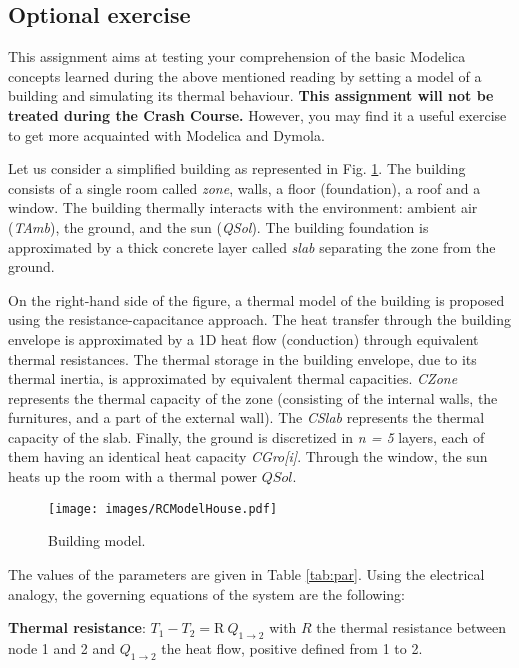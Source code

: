 \documentclass[10pt,a4paper]{article}
\begin{document}
\vspace{15 mm}

\subsection*{Optional exercise}
This assignment aims at testing your comprehension of the basic Modelica concepts learned during the above mentioned reading by setting a model of a building and simulating its thermal behaviour. \textbf{This assignment will not be treated during the Crash Course.} However, you may find it a useful exercise to get more acquainted with Modelica and Dymola.

Let us consider a simplified building as represented in Fig. \ref{fig:bui}. The building consists of a single room called \textit{zone}, walls, a floor (foundation), a roof and a window. The building thermally interacts with the environment: ambient air (\textit{TAmb}), the ground, and the sun (\textit{QSol}). The building foundation is approximated by a thick concrete layer called \textit{slab} separating the zone from the ground. 

On the right-hand side of the figure, a thermal model of the building is proposed using the resistance-capacitance approach. The heat transfer through the building envelope is approximated by a 1D heat flow (conduction) through equivalent thermal resistances. The thermal storage in the building envelope, due to its thermal inertia, is approximated by equivalent thermal capacities. \textit{CZone} represents the thermal capacity of the zone (consisting of the internal walls, the furnitures, and a part of the external wall). The \textit{CSlab} represents the thermal capacity of the slab. Finally, the ground is discretized in \textit{n = 5} layers, each of them having an identical heat capacity \textit{CGro[i]}. Through the window, the sun heats up the room with a thermal power $QSol$. 
\vspace{15 mm}

\begin{figure}[h] 
	\centering
	\texttt{[image: images/RCModelHouse.pdf]}
	\caption{ Building model.}
	\label{fig:bui}
\end{figure}


The values of the parameters are given in Table \ref{tab:par}. Using the electrical analogy, the governing equations of the system are the following:

\textbf{Thermal resistance}: $T_1 - T_2 = \text{R} \ Q_{1 \rightarrow 2} $ with $R$ the thermal resistance between node 1 and 2 and $Q_{1\rightarrow 2}$ the heat flow, positive defined from 1 to 2.
\end{document}
